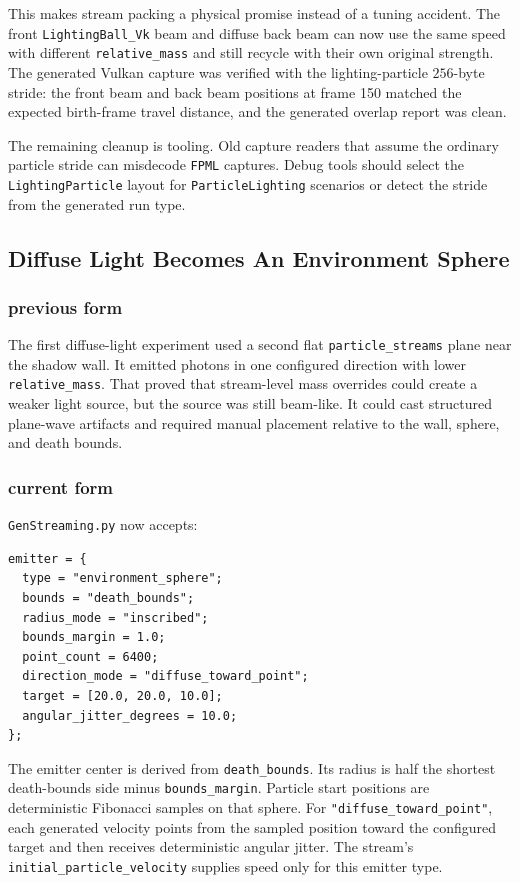 This makes stream packing a physical promise instead of a tuning accident.
The front \texttt{LightingBall\_Vk} beam and diffuse back beam can now use the
same speed with different \texttt{relative\_mass} and still recycle with their
own original strength.  The generated Vulkan capture was verified with the
lighting-particle \(256\)-byte stride: the front beam and back beam positions
at frame 150 matched the expected birth-frame travel distance, and the
generated overlap report was clean.

The remaining cleanup is tooling.  Old capture readers that assume the
ordinary particle stride can misdecode \texttt{FPML} captures.  Debug tools
should select the \texttt{LightingParticle} layout for
\texttt{ParticleLighting} scenarios or detect the stride from the generated
run type.

\subsection{Diffuse Light Becomes An Environment Sphere}

\subsubsection{previous form}

The first diffuse-light experiment used a second flat
\texttt{particle\_streams} plane near the shadow wall.  It emitted photons in
one configured direction with lower \texttt{relative\_mass}.  That proved
that stream-level mass overrides could create a weaker light source, but the
source was still beam-like.  It could cast structured plane-wave artifacts and
required manual placement relative to the wall, sphere, and death bounds.

\subsubsection{current form}

\texttt{GenStreaming.py} now accepts:
\begin{verbatim}
emitter = {
  type = "environment_sphere";
  bounds = "death_bounds";
  radius_mode = "inscribed";
  bounds_margin = 1.0;
  point_count = 6400;
  direction_mode = "diffuse_toward_point";
  target = [20.0, 20.0, 10.0];
  angular_jitter_degrees = 10.0;
};
\end{verbatim}

The emitter center is derived from \texttt{death\_bounds}.  Its radius is half
the shortest death-bounds side minus \texttt{bounds\_margin}.  Particle start
positions are deterministic Fibonacci samples on that sphere.  For
\texttt{"diffuse\_toward\_point"}, each generated velocity points from the
sampled position toward the configured target and then receives deterministic
angular jitter.  The stream's \texttt{initial\_particle\_velocity} supplies
speed only for this emitter type.

